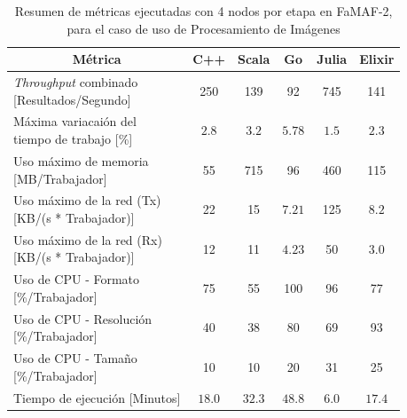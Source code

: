 \documentclass[11pt]{article}
\providecommand{\row}[1]{\parbox{150pt}{\setlength{\baselineskip}{0.2\baselineskip}\strut#1\strut}}
\newcommand{\english}[1]{\textit{#1}}
\begin{document}
\begin{table}[H]
\centering
\begin{tabular}{|l|c|c|c|c|c|}
\hline
\multicolumn{1}{|c|}{Métrica} & C++ & Scala & Go & Julia & Elixir \\ \hline
\row{\english{Throughput} combinado\\ {[}Resultados/Segundo{]}} & 250 & 139 & 92 & 745 & 141 \\ \hline
\row{Máxima variacaión del \\ tiempo de trabajo {[}\%{]}} & $2.8$ & $3.2$ & $5.78$ & $1.5$ & $2.3$ \\ \hline
\row{Uso máximo de memoria \\ {[}MB/Trabajador{]}} & 55 & 715 & 96 & 460 & 115 \\ \hline
\row{Uso máximo de la red (Tx)\\ {[}KB/(s * Trabajador){]}} & 22 & 15 & $7.21$ & 125 & $8.2$ \\ \hline
\row{Uso máximo de la red (Rx)\\ {[}KB/(s * Trabajador){]}} & 12 & 11 & $4.23$ & 50 & $3.0$ \\ \hline
\row{Uso de CPU - Formato \\ {[}\%/Trabajador{]}} & 75 & 55 & 100 & 96 & 77 \\ \hline
\row{Uso de CPU - Resolución \\ {[}\%/Trabajador{]}} & 40 & 38 & 80 & 69 & 93 \\ \hline
\row{Uso de CPU - Tamaño \\ {[}\%/Trabajador{]}} & 10 & 10 & 20 & 31 & 25 \\ \hline
Tiempo de ejecución {[}Minutos{]} & $18.0$ & $32.3$ & $48.8$ & $6.0$ & $17.4$ \\ \hline
\end{tabular}
\caption{Resumen de métricas ejecutadas con 4 nodos por etapa en FaMAF-2, para el caso de uso de Procesamiento de Imágenes}
\label{tab:ip:4_workers_famaf_2}
\end{table}
\end{document}
